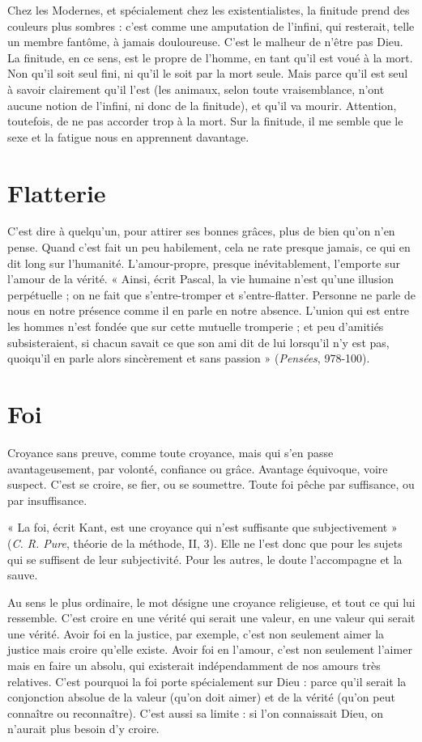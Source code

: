 Chez les Modernes, et spécialement chez les existentialistes, la finitude
prend des couleurs plus sombres : c’est comme une amputation de l'infini, qui
resterait, telle un membre fantôme, à jamais douloureuse. C’est le malheur de
n'être pas Dieu. La finitude, en ce sens, est le propre de l’homme, en tant qu’il
est voué à la mort. Non qu’il soit seul fini, ni qu’il le soit par la mort seule.
Mais parce qu’il est seul à savoir clairement qu’il l’est (les animaux, selon toute
vraisemblance, n’ont aucune notion de l'infini, ni donc de la finitude), et qu’il
va mourir. Attention, toutefois, de ne pas accorder trop à la mort. Sur la finitude,
il me semble que le sexe et la fatigue nous en apprennent davantage.

\section{Flatterie}
C'est dire à quelqu'un, pour attirer ses bonnes grâces, plus de
bien qu’on n’en pense. Quand c’est fait un peu habilement,
cela ne rate presque jamais, ce qui en dit long sur l'humanité. L’amour-propre,
presque inévitablement, l'emporte sur l'amour de la vérité. « Ainsi, écrit Pascal,
la vie humaine n’est qu’une illusion perpétuelle ; on ne fait que s’entre-tromper
et s’entre-flatter. Personne ne parle de nous en notre présence comme il en
parle en notre absence. L’union qui est entre les hommes n’est fondée que sur
cette mutuelle tromperie ; et peu d’amitiés subsisteraient, si chacun savait ce
que son ami dit de lui lorsqu'il n’y est pas, quoiqu'il en parle alors sincèrement
et sans passion » ({\it Pensées}, 978-100).

\section{Foi}
Croyance sans preuve, comme toute croyance, mais qui s’en passe avantageusement,
par volonté, confiance ou grâce. Avantage équivoque,
voire suspect. C’est se croire, se fier, ou se soumettre. Toute foi pêche par suffisance,
ou par insuffisance.

« La foi, écrit Kant, est une croyance qui n’est suffisante que subjectivement »
({\it C. R. Pure}, théorie de la méthode, II, 3). Elle ne l’est donc que
pour les sujets qui se suffisent de leur subjectivité. Pour les autres, le doute
l'accompagne et la sauve.

Au sens le plus ordinaire, le mot désigne une croyance religieuse, et tout ce
qui lui ressemble. C’est croire en une vérité qui serait une valeur, en une valeur
qui serait une vérité. Avoir foi en la justice, par exemple, c’est non seulement
aimer la justice mais croire qu’elle existe. Avoir foi en l’amour, c’est non seulement
l’aimer mais en faire un absolu, qui existerait indépendamment de nos
amours très relatives. C’est pourquoi la foi porte spécialement sur Dieu : parce
qu’il serait la conjonction absolue de la valeur (qu’on doit aimer) et de la vérité
(qu’on peut connaître ou reconnaître). C’est aussi sa limite : si l’on connaissait
Dieu, on n’aurait plus besoin d’y croire.

